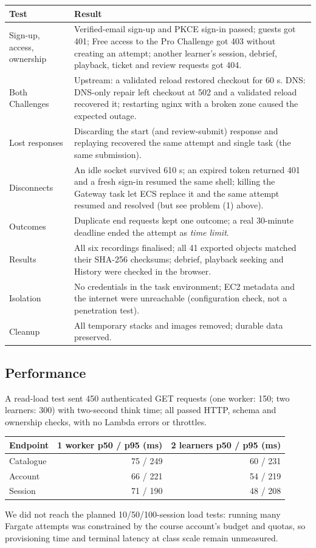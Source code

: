 \documentclass[11pt,a4paper]{article}
\begin{document}
\begin{center}\footnotesize
\begin{tabularx}{\linewidth}{@{}>{\raggedright\arraybackslash}p{26mm}Y@{}}
\toprule
\textbf{Test} & \textbf{Result}\\
\midrule
Sign-up, access, ownership & Verified-email sign-up and PKCE sign-in passed; guests got 401;
Free access to the Pro Challenge got 403 without creating an attempt; another
learner's session, debrief, playback, ticket and review requests got 404.\\
Both Challenges & Upstream: a validated reload restored checkout for 60 s. DNS:
DNS-only repair left checkout at 502 and a validated reload recovered it;
restarting nginx with a broken zone caused the expected outage.\\
Lost responses & Discarding the start (and review-submit) response and replaying
recovered the same attempt and single task (the same submission).\\
Disconnects & An idle socket survived 610 s; an expired token returned 401 and a fresh
sign-in resumed the same shell; killing the Gateway task let ECS replace it and the
same attempt resumed and resolved (but see problem (1) above).\\
Outcomes & Duplicate end requests kept one outcome; a real 30-minute deadline ended the
attempt as \emph{time limit}.\\
Results & All six recordings finalised; all 41 exported objects matched their SHA-256
checksums; debrief, playback seeking and History were checked in the browser.\\
Isolation & No credentials in the task environment; EC2 metadata and the internet
were unreachable (configuration check, not a penetration test).\\
Cleanup & All temporary stacks and images removed; durable data preserved.\\
\bottomrule
\end{tabularx}
\end{center}
\subsection{Performance}
A read-load test sent 450 authenticated GET requests (one worker: 150; two
learners: 300) with two-second think time; all passed HTTP, schema and ownership checks, with no Lambda errors or
throttles.
\begin{center}\small
\begin{tabular}{@{}lrr@{}}
\toprule
Endpoint & 1 worker p50 / p95 (ms) & 2 learners p50 / p95 (ms)\\
\midrule
Catalogue & 75 / 249 & 60 / 231\\
Account   & 66 / 221 & 54 / 219\\
Session   & 71 / 190 & 48 / 208\\
\bottomrule
\end{tabular}
\end{center}
We did not reach the planned 10/50/100-session load tests: running many
Fargate attempts was constrained by the course account's budget and quotas, so
provisioning time and terminal latency at class scale remain unmeasured.
\end{document}
